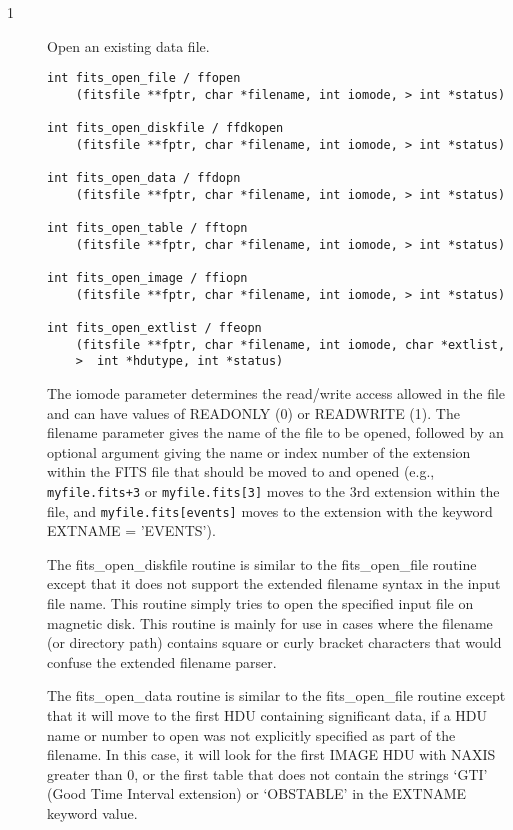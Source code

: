 \documentclass[11pt]{book}
\begin{document}
\begin{description}
\item[1 ] Open an existing data file. \label{ffopen}


\begin{verbatim}
int fits_open_file / ffopen
    (fitsfile **fptr, char *filename, int iomode, > int *status)

int fits_open_diskfile / ffdkopen
    (fitsfile **fptr, char *filename, int iomode, > int *status)

int fits_open_data / ffdopn
    (fitsfile **fptr, char *filename, int iomode, > int *status)

int fits_open_table / fftopn
    (fitsfile **fptr, char *filename, int iomode, > int *status)

int fits_open_image / ffiopn
    (fitsfile **fptr, char *filename, int iomode, > int *status)

int fits_open_extlist / ffeopn
    (fitsfile **fptr, char *filename, int iomode, char *extlist,
    >  int *hdutype, int *status)
\end{verbatim}

The iomode parameter determines the read/write access allowed in the
file and can have values of READONLY (0) or READWRITE (1). The filename
parameter gives the name of the file to be opened, followed by an
optional argument giving the name or index number of the extension
within the FITS file that should be moved to and opened (e.g.,
\verb-myfile.fits+3- or \verb-myfile.fits[3]- moves to the 3rd extension within
the file, and \verb-myfile.fits[events]- moves to the extension with the
keyword EXTNAME = 'EVENTS').

The fits\_open\_diskfile routine is similar to the fits\_open\_file routine
except that it does not support the extended filename syntax in the input
file name.  This routine simply tries to open the specified input file
on magnetic disk.  This routine is mainly for use in cases where the
filename (or directory path) contains square or curly bracket characters
that would confuse the extended filename parser.

The fits\_open\_data routine is similar to the fits\_open\_file routine
except that it will move to the first HDU containing significant data,
if a HDU name or number to open was not explicitly specified as
part of the filename.  In this case, it will look for the first
IMAGE HDU with NAXIS greater than 0, or the first table that does not contain the
strings `GTI' (Good Time Interval extension) or `OBSTABLE' in the
EXTNAME keyword value.


\end{description}
\end{document}
